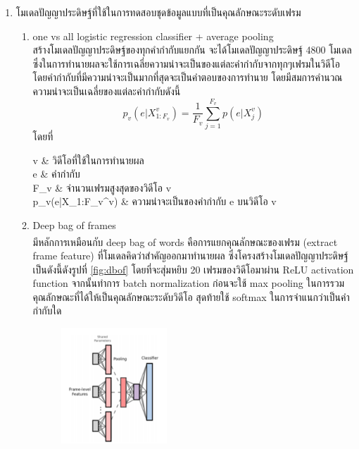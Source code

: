 \begin{enumerate}
\begin{enumerate}
		\item โมเดลปัญญาประดิษฐ์ที่ใช้ในการทดสอบชุดข้อมูลแบบที่เป็นคุณลักษณะระดับเฟรม
			\begin{enumerate}
				\setlength\itemsep{-0.25em}
				\item one vs all logistic regression classifier + average pooling\\ 
				สร้างโมเดลปัญญาประดิษฐ์ของทุกคำกำกับแยกกัน จะได้โมเดลปัญญาประดิษฐ์ 4800 โมเดล ซึ่งในการทำนายผลจะใช้การเฉลี่ยความน่าจะเป็นของแต่ละคำกำกับจากทุกๆเฟรมในวิดีโอ
				โดยคำกำกับที่มีความน่าจะเป็นมากที่สุดจะเป็นคำตอบของการทำนาย โดยมีสมการคำนวณความน่าจะเป็นเฉลี่ยของแต่ละคำกำกับดังนี้
				\begin{equation}
					p_v(e|X_{1:F_v}^v) = \frac{1}{F_v} \sum_{j=1}^{F_v}p(e|X^v_j)
				\end{equation}
				โดยที่
				\begin{conditions}
					v      		&  วิดีโอที่ใช้ในการทำนายผล  \\   
					e 			&  คำกำกับ								\\
					F_v 		&  จำนวนเฟรมสูงสุดของวิดีโอ v	\\
					p_v(e|X_{1:F_v}^v)     	&  ความน่าจะเป็นของคำกำกับ e บนวิดีโอ v	\\
				\end{conditions}
				\item Deep bag of frames\\
				มีหลักการเหมือนกับ deep bag of words\textsuperscript{\cite{liu20172}} คือการแยกคุณลักษณะของเฟรม (extract frame feature) 
				ที่โมเดลคิดว่าสำคัญออกมาทำนายผล ซึ่งโครงสร้างโมเดลปัญญาประดิษฐ์เป็นดังนี้ดังรูปที่ \ref{fig:dbof} โดยที่จะสุ่มหยิบ 20 เฟรมของวิดีโอมาผ่าน ReLU activation function
				จากนั้นทำการ batch normalization ก่อนจะใช้ max pooling ในการรวมคุณลักษณะที่ได้ให้เป็นคุณลักษณะระดับวิดีโอ สุดท้ายใช้ softmax ในการจำแนกว่าเป็นคำกำกับใด
				\begin{figure}[!ht]
					\centering
					\includegraphics[width=0.4\textwidth]{chapter2/images/DBoF.png}

\end{figure}
\end{enumerate}
\end{enumerate}
\end{enumerate}
